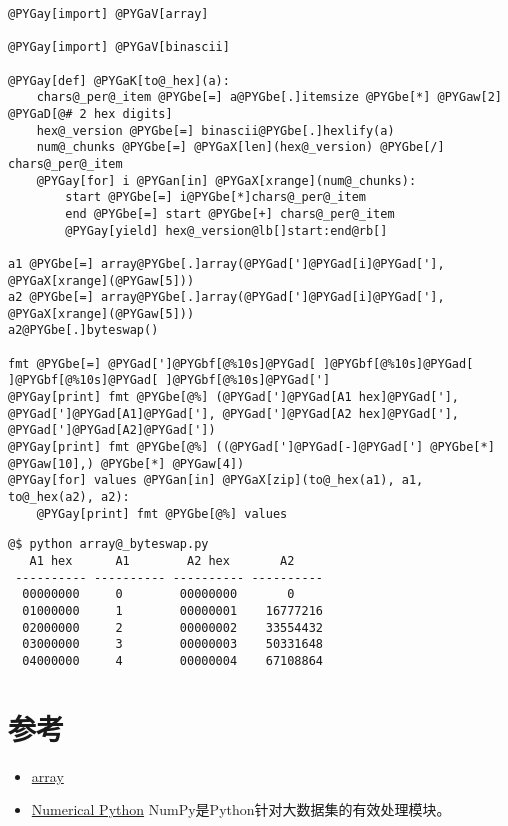 \documentclass[a4paper,10pt,english]{manual}
\begin{document}
\begin{Verbatim}[commandchars=@\[\]]
@PYGay[import] @PYGaV[array]

@PYGay[import] @PYGaV[binascii]

@PYGay[def] @PYGaK[to@_hex](a):
    chars@_per@_item @PYGbe[=] a@PYGbe[.]itemsize @PYGbe[*] @PYGaw[2] @PYGaD[@# 2 hex digits]
    hex@_version @PYGbe[=] binascii@PYGbe[.]hexlify(a)
    num@_chunks @PYGbe[=] @PYGaX[len](hex@_version) @PYGbe[/] chars@_per@_item
    @PYGay[for] i @PYGan[in] @PYGaX[xrange](num@_chunks):
        start @PYGbe[=] i@PYGbe[*]chars@_per@_item
        end @PYGbe[=] start @PYGbe[+] chars@_per@_item
        @PYGay[yield] hex@_version@lb[]start:end@rb[]

a1 @PYGbe[=] array@PYGbe[.]array(@PYGad[']@PYGad[i]@PYGad['], @PYGaX[xrange](@PYGaw[5]))
a2 @PYGbe[=] array@PYGbe[.]array(@PYGad[']@PYGad[i]@PYGad['], @PYGaX[xrange](@PYGaw[5]))
a2@PYGbe[.]byteswap()

fmt @PYGbe[=] @PYGad[']@PYGbf[@%10s]@PYGad[ ]@PYGbf[@%10s]@PYGad[ ]@PYGbf[@%10s]@PYGad[ ]@PYGbf[@%10s]@PYGad[']
@PYGay[print] fmt @PYGbe[@%] (@PYGad[']@PYGad[A1 hex]@PYGad['], @PYGad[']@PYGad[A1]@PYGad['], @PYGad[']@PYGad[A2 hex]@PYGad['], @PYGad[']@PYGad[A2]@PYGad['])
@PYGay[print] fmt @PYGbe[@%] ((@PYGad[']@PYGad[-]@PYGad['] @PYGbe[*] @PYGaw[10],) @PYGbe[*] @PYGaw[4])
@PYGay[for] values @PYGan[in] @PYGaX[zip](to@_hex(a1), a1, to@_hex(a2), a2):
    @PYGay[print] fmt @PYGbe[@%] values
\end{Verbatim}

\begin{Verbatim}[commandchars=@\[\]]
@$ python array@_byteswap.py
   A1 hex      A1        A2 hex       A2
 ---------- ---------- ---------- ----------
  00000000     0        00000000       0
  01000000     1        00000001    16777216
  02000000     2        00000002    33554432
  03000000     3        00000003    50331648
  04000000     4        00000004    67108864
\end{Verbatim}


\section{参考}
\begin{itemize}
\item {} 
\href{http://docs.python.org/library/array.html}{array}

\item {} 
\href{http://www.scipy.org/}{Numerical Python} NumPy是Python针对大数据集的有效处理模块。

\end{itemize}
\end{document}
